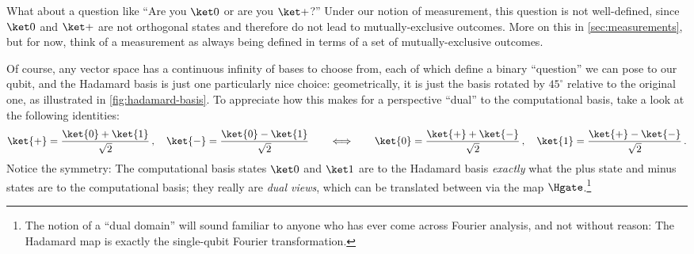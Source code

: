       What about a question like ``Are you $\ket 0$ or
        are you $\ket +$?'' Under our notion of measurement, this question is not
        well-defined, since $\ket 0$ and $\ket +$ are not orthogonal states and
        therefore do not lead to mutually-exclusive outcomes. More on this in
        \cref{sec:measurements}, but for now, think of a measurement as always
        being defined in terms of a set of mutually-exclusive outcomes.

	    Of course, any vector space has a continuous infinity of 
	      bases to choose from, each of which define a binary ``question'' we
	      can pose to our qubit, and the Hadamard
	      basis is just one particularly nice choice:
	      geometrically, it is just the basis rotated by $45^\circ$
	      relative to the original one, as illustrated in
	      \cref{fig:hadamard-basis}.
	      To appreciate how this makes for a perspective
         ``dual'' to the computational basis,
	      take a look at the following identities:
        \[
          \ket{+} = \frac{\ket{0} + \ket{1}}{\sqrt{2}}\, , \quad 
          \ket{-} = \frac{\ket{0} - \ket{1}}{\sqrt{2}}
          \qquad
          \Longleftrightarrow
          \qquad
          \ket{0} = \frac{\ket{+} + \ket{-}}{\sqrt{2}}\, , \quad 
          \ket{1} = \frac{\ket{+} - \ket{-}}{\sqrt{2}}\, .
        \]
        Notice the symmetry: The computational basis states $\ket 0$ and $\ket 1$
        are to the Hadamard basis \emph{exactly} what the plus state and minus
        states are to the computational basis; they really are \emph{dual views},
        which can be translated between via the map $\Hgate$.\footnote{
          The notion of a ``dual domain'' will sound familiar to anyone who has
          ever come across Fourier analysis, and not without reason: The Hadamard
          map is exactly the single-qubit Fourier transformation.
        }

